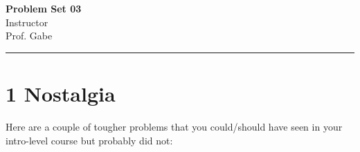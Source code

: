 \documentclass[12pt]{article}
\newif\ifshow
\begin{document}
\begin{center}
\ifshow
  \textbf{\Large Problem Set 03 Solution}\\
\else
  \textbf{\Large Problem Set 03}\\
\fi
Instructor \\ Prof. Gabe\\
\end{center}

\hrule

\vspace{0.2cm}


\section{1 Nostalgia}
Here are a couple of tougher problems that you could/should have seen in your intro-level course but probably did not:
\end{document}
